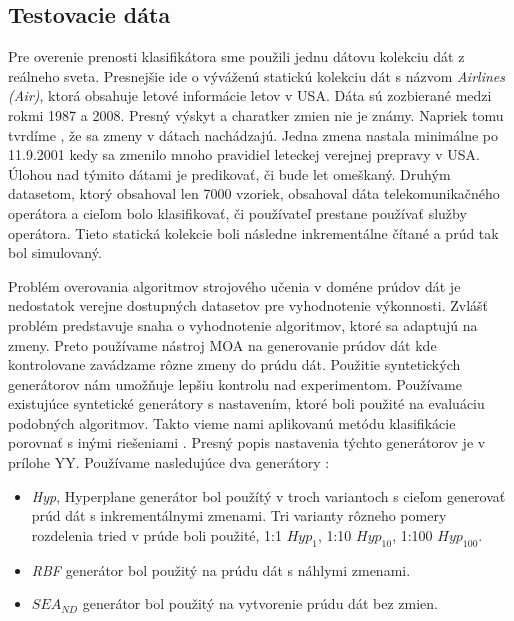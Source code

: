 \subsection{Testovacie dáta}
Pre overenie prenosti klasifikátora sme použili jednu dátovu kolekciu dát z reálneho sveta. Presnejšie ide o výváženú statickú kolekciu dát s názvom \textit{Airlines (Air)}, ktorá obsahuje letové informácie letov v USA. Dáta sú zozbierané medzi rokmi 1987 a 2008. Presný výskyt a charatker zmien nie je známy. Napriek tomu tvrdíme \citep{brzezinski2014prequential, krawczyk2015one}, že sa zmeny v dátach nachádzajú. Jedna zmena nastala minimálne po 11.9.2001 kedy sa zmenilo mnoho pravidiel leteckej verejnej prepravy v USA. Úlohou nad týmito dátami je predikovať, či bude let omeškaný. Druhým datasetom, ktorý obsahoval len 7000 vzoriek, obsahoval dáta telekomunikačného operátora a cieľom bolo klasifikovať, či používateľ prestane používať služby operátora. Tieto statická kolekcie boli následne inkrementálne čítané a prúd tak bol simulovaný.
\par
Problém overovania algoritmov strojového učenia v doméne prúdov dát je nedostatok verejne dostupných datasetov pre vyhodnotenie výkonnosti. Zvlášť problém predstavuje snaha o vyhodnotenie algoritmov, ktoré sa adaptujú na zmeny. Preto používame nástroj MOA na generovanie prúdov dát kde kontrolovane zavádzame rôzne zmeny do prúdu dát. Použitie syntetických generátorov nám umožňuje lepšiu kontrolu nad experimentom. Používame existujúce syntetické generátory s nastavením, ktoré boli použité na evaluáciu podobných algoritmov. Takto vieme nami aplikovanú metódu klasifikácie porovnať s inými riešeniami \citep{krawczyk2015one, brzezinski2014prequential}. Presný popis nastavenia týchto generátorov je v prílohe YY. Používame nasledujúce dva generátory \citep{bifet2010moa}:
\begin{itemize}
	\item \textit{Hyp}, Hyperplane generátor bol použítý v troch variantoch s cieľom generovať prúd dát s inkrementálnymi zmenami. Tri varianty rôzneho pomery rozdelenia tried v prúde boli použité, 1:1 $Hyp_1$, 1:10 $Hyp_10$, 1:100 $Hyp_100$.
	\item \textit{RBF} generátor bol použitý na prúdu dát s náhlymi zmenami.
	\item \textit{$SEA_{ND}$} generátor bol použitý na vytvorenie prúdu dát bez zmien.
\end{itemize}

